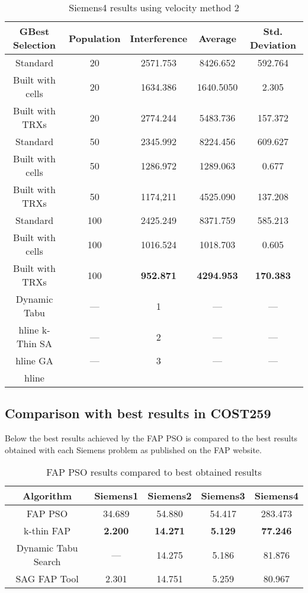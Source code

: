 \begin{table}[H]
\centering
	\begin{tabular}{| c | c | c | c | c |}
	\hline
	GBest Selection & Population & Interference & Average & Std. Deviation\\ \hline
	Standard & 20 & 2571.753 & 8426.652 & 592.764\\ \hline
	Built with cells & 20 & 1634.386 & 1640.5050 & 2.305\\ \hline
	Built with TRXs & 20 & 2774.244 & 5483.736 & 157.372\\ \hline
	Standard & 50 & 2345.992 & 8224.456 & 609.627\\ \hline
	Built with cells & 50 & 1286.972 & 1289.063 & 0.677\\ \hline
	Built with TRXs & 50 & 1174,211 & 4525.090 & 137.208\\ \hline
	Standard & 100 & 2425.249 & 8371.759 & 585.213\\ \hline
	Built with cells & 100 & 1016.524 & 1018.703 & 0.605\\ \hline
	Built with TRXs & 100 & \textbf{952.871} & \textbf{4294.953} & \textbf{170.383}\\ \hline
    Dynamic Tabu & --- & 1 & --- & --- \\hline
    k-Thin SA & --- & 2 & --- & --- \\hline
    GA & --- & 3 & --- & --- \\hline
	\end{tabular}
\caption{Siemens4 results using velocity method 2}
\label{tab:siem4m2}
\end{table}
\subsection{Comparison with best results in COST259}
Below the best results achieved by the FAP PSO is compared to the best results obtained with each Siemens problem as published on the FAP website\cite{FAPWeb}.
\begin{table}[H]
\centering
	\begin{tabular}{| c | c | c | c | c |}
	\hline
	Algorithm & Siemens1 & Siemens2 & Siemens3 & Siemens4 \\ \hline
	FAP PSO & 34.689 & 54.880 & 54.417 & 283.473 \\ \hline
	k-thin FAP & \textbf{2.200} & \textbf{14.271} & \textbf{5.129} & \textbf{77.246} \\ \hline
	Dynamic Tabu Search & --- & 14.275 & 5.186 & 81.876 \\ \hline
	SAG FAP Tool & 2.301 & 14.751 & 5.259 & 80.967 \\ \hline
	\end{tabular}
\caption{FAP PSO results compared to best obtained results}
\label{tab:siem4m2}
\end{table}
